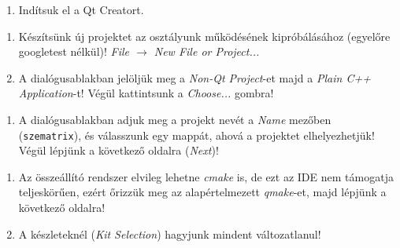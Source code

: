 
\begin{frame}
  \begin{enumerate}
    \item Indítsuk el a Qt Creatort.\\
    \setcounter{qt}{\theenumi}
  \end{enumerate}
\end{frame}

\begin{frame}
  \begin{enumerate}
    \setcounter{enumi}{\theqt}
    \item Készítsünk új projektet az osztályunk működésének kipróbálásához (egyelőre googletest nélkül)! \emph{File $\to$ New 
File or Project...}
    \item A dialógusablakban jelöljük meg a \emph{Non-Qt Project}-et majd a \emph{Plain C++ Application}-t! Végül kattintsunk a 
\emph{Choose...} gombra!\\
    \setcounter{qt}{\theenumi}
  \end{enumerate}
\end{frame}

\begin{frame}
  \begin{enumerate}
    \setcounter{enumi}{\theqt}
    \item A dialógusablakban adjuk meg a projekt nevét a \emph{Name} mezőben (\texttt{szematrix}), és válasszunk egy mappát, ahová a projektet elhelyezhetjük! Végül lépjünk a következő oldalra (\emph{Next})!\\
    \setcounter{qt}{\theenumi}
  \end{enumerate}
\end{frame}

\begin{frame}
  \begin{enumerate}
    \setcounter{enumi}{\theqt}
    \item Az összeállító rendszer elvileg lehetne \emph{cmake} is, de ezt az IDE nem támogatja teljeskörűen, ezért őrizzük meg 
az alapértelmezett \emph{qmake}-et, majd lépjünk a következő oldalra!\\
    \item A készleteknél (\emph{Kit Selection}) hagyjunk mindent változatlanul!
    \setcounter{qt}{\theenumi}
  \end{enumerate}
\end{frame}

